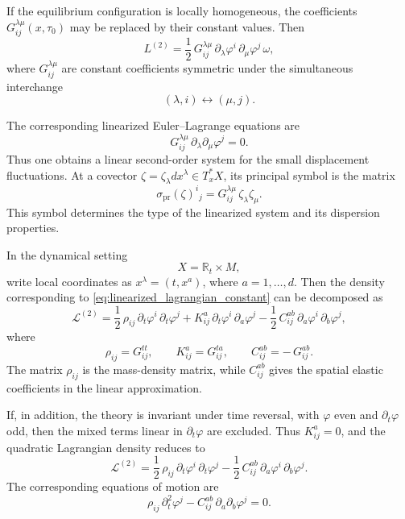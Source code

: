 \documentclass[11pt]{amsart}
\theoremstyle{plain}
\theoremstyle{definition}
\theoremstyle{remark}
\begin{document}
If the equilibrium configuration is locally homogeneous, the coefficients 
\(G^{\lambda\mu}_{ij}(x,\tau_0)\) may be replaced by their constant values. 
Then
\begin{equation}
	L^{(2)}
	=
	\frac12\,G^{\lambda\mu}_{ij}\,
	\partial_\lambda\varphi^i\,\partial_\mu\varphi^j\,\omega,
	\label{eq:linearized_lagrangian_constant}
\end{equation}
where \(G^{\lambda\mu}_{ij}\) are constant coefficients symmetric under the simultaneous interchange
\[
(\lambda,i)\longleftrightarrow (\mu,j).
\]

The corresponding linearized Euler--Lagrange equations are
\begin{equation}
	G^{\lambda\mu}_{ij}\,\partial_\lambda\partial_\mu\varphi^j=0.
	\label{eq:linearized_EL_general}
\end{equation}
Thus one obtains a linear second-order system for the small displacement fluctuations. 
At a covector \(\zeta=\zeta_\lambda dx^\lambda\in T_x^*X\), its principal symbol is the matrix
\begin{equation}
	\sigma_{\mathrm{pr}}(\zeta)^i{}_j
	=
	G^{\lambda\mu}_{ij}\,\zeta_\lambda\zeta_\mu.
	\label{eq:principal_symbol_linearized}
\end{equation}
This symbol determines the type of the linearized system and its dispersion properties.

\medskip

In the dynamical setting
\[
X=\mathbb R_t\times M,
\]
write local coordinates as \(x^\lambda=(t,x^a)\), where \(a=1,\dots,d\). 
Then the density corresponding to \eqref{eq:linearized_lagrangian_constant} can be decomposed as
\begin{equation}
	\mathcal L^{(2)}
	=
	\frac12\,\rho_{ij}\,\partial_t\varphi^i\,\partial_t\varphi^j
	+
	K^a_{ij}\,\partial_t\varphi^i\,\partial_a\varphi^j
	-
	\frac12\,C^{ab}_{ij}\,\partial_a\varphi^i\,\partial_b\varphi^j,
	\label{eq:linearized_lagrangian_split}
\end{equation}
where
\[
\rho_{ij}=G^{tt}_{ij},
\qquad
K^a_{ij}=G^{ta}_{ij},
\qquad
C^{ab}_{ij}=-\,G^{ab}_{ij}.
\]
The matrix \(\rho_{ij}\) is the mass-density matrix, while \(C^{ab}_{ij}\) gives the spatial elastic coefficients in the linear approximation.

If, in addition, the theory is invariant under time reversal, with \(\varphi\) even and \(\partial_t\varphi\) odd, then the mixed terms linear in \(\partial_t\varphi\) are excluded. 
Thus \(K^a_{ij}=0\), and the quadratic Lagrangian density reduces to
\begin{equation}
	\mathcal L^{(2)}
	=
	\frac12\,\rho_{ij}\,\partial_t\varphi^i\,\partial_t\varphi^j
	-
	\frac12\,C^{ab}_{ij}\,\partial_a\varphi^i\,\partial_b\varphi^j.
	\label{eq:linearized_lagrangian_time_reversal}
\end{equation}
The corresponding equations of motion are
\begin{equation}
	\rho_{ij}\,\partial_t^2\varphi^j
	-
	C^{ab}_{ij}\,\partial_a\partial_b\varphi^j
	=
	0.
	\label{eq:linearized_phonon_equation}
\end{equation}
\end{document}
